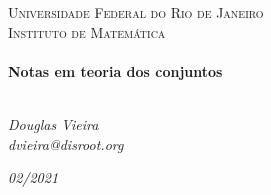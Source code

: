 \begin{titlepage}
\begin{center}
\textsc{\Large Universidade Federal do Rio de Janeiro}\\
\textsc{\large Instituto de Matemática}\\[1.5cm]
\LinhaR \\[0.4cm]
{ \LARGE \bfseries Notas em teoria dos conjuntos \\[0.4cm]}
\LinhaR \\[1.4cm]

\noindent
\begin{minipage}{0.4\textwidth}
\begin{center} \large
\emph{Douglas Vieira}\\
\itshape{dvieira@disroot.org}
\end{center}
\end{minipage}

\begin{center}
\end{center}

\vfill
{\large \textit{02/2021}}

\end{center}
\end{titlepage}
\clearpage